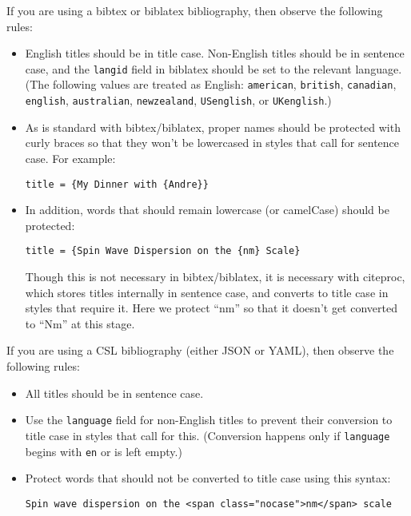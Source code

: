 \documentclass[
  a4paper,
]{article}
\begin{document}
If you are using a bibtex or biblatex bibliography, then observe the
following rules:

\begin{itemize}
\item
  English titles should be in title case. Non-English titles should be
  in sentence case, and the \texttt{langid} field in biblatex should be
  set to the relevant language. (The following values are treated as
  English: \texttt{american}, \texttt{british}, \texttt{canadian},
  \texttt{english}, \texttt{australian}, \texttt{newzealand},
  \texttt{USenglish}, or \texttt{UKenglish}.)
\item
  As is standard with bibtex/biblatex, proper names should be protected
  with curly braces so that they won't be lowercased in styles that call
  for sentence case. For example:

\begin{verbatim}
title = {My Dinner with {Andre}}
\end{verbatim}
\item
  In addition, words that should remain lowercase (or camelCase) should
  be protected:

\begin{verbatim}
title = {Spin Wave Dispersion on the {nm} Scale}
\end{verbatim}

  Though this is not necessary in bibtex/biblatex, it is necessary with
  citeproc, which stores titles internally in sentence case, and
  converts to title case in styles that require it. Here we protect
  ``nm'' so that it doesn't get converted to ``Nm'' at this stage.
\end{itemize}

If you are using a CSL bibliography (either JSON or YAML), then observe
the following rules:

\begin{itemize}
\item
  All titles should be in sentence case.
\item
  Use the \texttt{language} field for non-English titles to prevent
  their conversion to title case in styles that call for this.
  (Conversion happens only if \texttt{language} begins with \texttt{en}
  or is left empty.)
\item
  Protect words that should not be converted to title case using this
  syntax:

\begin{verbatim}
Spin wave dispersion on the <span class="nocase">nm</span> scale
\end{verbatim}
\end{itemize}
\end{document}
